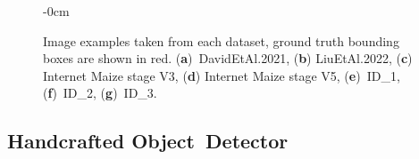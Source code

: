 \documentclass[12pt,a4paper,oneside]{report}
\newlength{\extralength}
\begin{document}
\begin{landscape}
\begin{figure}
\begin{adjustwidth}{-\extralength}{0cm}

\end{adjustwidth}
  \caption{Image examples taken from each dataset, ground truth bounding boxes are shown  in red. %
  (\textbf{a})~DavidEtAl.2021, 
 (\textbf{b}) LiuEtAl.2022, 
  (\textbf{c}) Internet Maize stage V3,
  (\textbf{d}) Internet Maize stage V5,
  (\textbf{e})~ID\_1,
  (\textbf{f})~ID\_2,
  (\textbf{g})~ID\_3.}
  \label{fig:datasets}  
\end{figure}
\end{landscape}

\subsection{Handcrafted Object~Detector}
\end{document}
